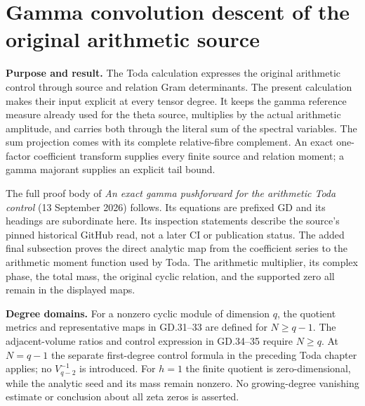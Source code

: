 \section{Gamma convolution descent of the original arithmetic source}
\label{sec:gamma-convolution-descent}

\textbf{Purpose and result.}
The Toda calculation expresses the original arithmetic control through
source and relation Gram determinants. The present calculation makes their
input explicit at every tensor degree. It keeps the gamma reference measure
already used for the theta source, multiplies by the actual arithmetic
amplitude, and carries both through the literal sum of the spectral variables.
The sum projection comes with its complete relative-fibre complement.
An exact one-factor coefficient transform supplies every finite source and
relation moment; a gamma majorant supplies an explicit tail bound.

The full proof body of \emph{An exact gamma pushforward for the arithmetic
Toda control} (13 September 2026) follows. Its equations are prefixed GD
and its headings are subordinate here. Its inspection statements describe
the source's pinned historical GitHub read, not a later CI or publication
status. The added final subsection proves the direct analytic map from
the coefficient series to the arithmetic moment function used by Toda.
The arithmetic multiplier, its complex phase, the total mass, the original
cyclic relation, and the supported zero all remain in the displayed maps.

\textbf{Degree domains.}
For a nonzero cyclic module of dimension \(q\), the quotient metrics and
representative maps in GD.31--33 are defined for \(N\geq q-1\).
The adjacent-volume ratios and control expression in GD.34--35 require
\(N\geq q\). At \(N=q-1\) the separate first-degree control formula in
the preceding Toda chapter applies; no \(V_{q-2}^{-1}\) is introduced.
For \(h=1\) the finite quotient is zero-dimensional, while the analytic
seed and its mass remain nonzero. No growing-degree vanishing estimate
or conclusion about all zeta zeros is asserted.

\begingroup
\setlength{\emergencystretch}{3em}
\providecommand{\tightlist}{\setlength{\itemsep}{0pt}\setlength{\parskip}{0pt}}
